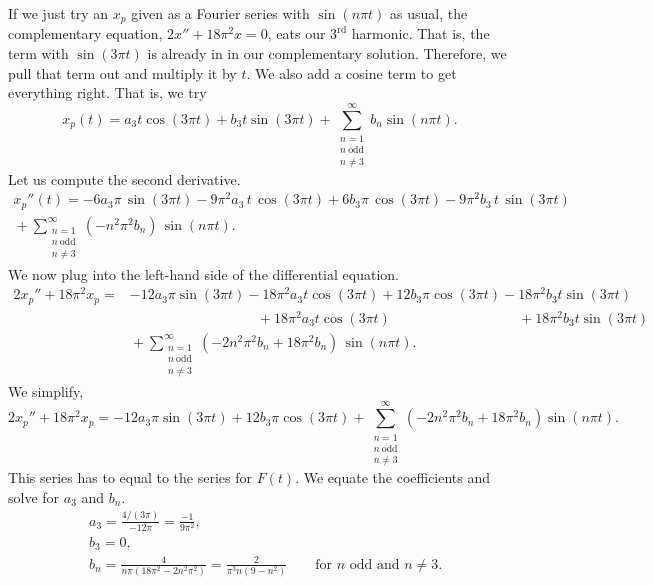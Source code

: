 \documentclass{ximera}
\begin{document}
\begin{exampleSol}
    If we just try an $x_p$ given as a Fourier series with $\sin (n\pi t)$ as usual, the complementary equation, $2x''+18\pi^2x=0$, eats our $3^\text{rd}$ harmonic.  That is, the term with $\sin(3 \pi t)$ is already in in our complementary solution. Therefore, we pull that term out and multiply it by $t$.  We also add a cosine term to get everything right. That is, we try
    \begin{equation*}
        x_p(t) = a_3 t \cos (3 \pi t ) + b_3 t \sin (3 \pi t) + \sum_{\substack{n=1 \\ 
        n~\text{odd} \\ 
        n\not= 3}}^\infty b_n \sin (n \pi t) . 
    \end{equation*}
    Let us compute the second derivative.
    \begin{multline*}
        x_p''(t) = - 6 a_3
        \pi \, \sin (3 \pi t) - 9\pi^2 a_3 \, t \, \cos (3 \pi t) + 6 b_3
        \pi \, \cos (3 \pi t) - 9\pi^2 b_3 \, t \, \sin (3 \pi t) \\
        {} + \sum_{\substack{n=1 \\ 
        n~\text{odd} \\ n\not= 3}}^\infty (-n^2 \pi^2 b_n ) \, \sin (n \pi t) . 
    \end{multline*}
    We now plug into the left-hand side of the differential equation.
    \begin{align*}
        2x_p'' + 18\pi^2 x_p 
        = & - 12 a_3 \pi \sin (3 \pi t) - 18\pi^2 a_3 t \cos (3 \pi t) + 12 b_3 \pi \cos (3 \pi t) - 18\pi^2 b_3 t \sin (3 \pi t) \\
        & \phantom{\, - 12 a_3 \pi \sin (3 \pi t)} ~ {} + 18 \pi^2 a_3 t \cos (3 \pi t) \phantom{\, + 12 b_3 \pi \cos (3 \pi t)} ~ {} + 18 \pi^2 b_3 t \sin (3 \pi t) \\
        & {} + \sum_{\substack{n=1 \\ n~\text{odd} \\ n\not= 3}}^\infty (-2n^2 \pi^2 b_n + 18\pi^2 b_n) \, \sin (n \pi t) . 
    \end{align*}
    We simplify,
    \begin{equation*}
        2x_p'' + 18\pi^2 x_p = - 12 a_3 \pi \sin (3 \pi t) + 12 b_3 \pi \cos (3 \pi t) + \sum_{\substack{n=1 \\ n~\text{odd} \\ n\not= 3}}^\infty (-2n^2 \pi^2 b_n + 18\pi^2 b_n) \sin (n \pi t) . 
    \end{equation*}
    This series has to equal to the series for $F(t)$. We equate the coefficients and solve for $a_3$ and $b_n$.
    \begin{align*}
        & a_3 = \frac{4/(3\pi)}{-12\pi} = \frac{-1}{9\pi^2} , \\
        & b_3 = 0 , \\
        & b_n = \frac{4}{n\pi(18\pi^2 - 2n^2 \pi^2)} 
        = \frac{2}{\pi^3 n(9 - n^2)} \qquad \text{for } n \text{ odd and } n\not=3 .
    \end{align*}
    

\end{exampleSol}
\end{document}
